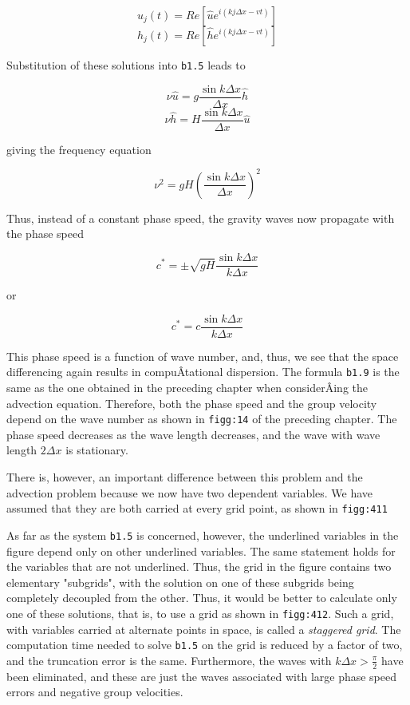 {\[u_{j}\left( t \right) = Re\left\lbrack \widehat{u}e^{i\left( kj\Delta x - vt \right)} \right\rbrack\]\[h_{j}\left( t \right) = Re\left\lbrack \widehat{h}e^{i\left( kj\Delta x - vt \right)} \right\rbrack\]}

Substitution of these solutions into \texttt{b1.5} leads to

\[\nu\widehat{u} = g\frac{\sin{k\Delta x}}{\Delta x}\widehat{h}\]\[\nu\widehat{h} = H\frac{\sin{k\Delta x}}{\Delta x}\widehat{u}\]

giving the frequency equation

{\[\nu^{2} = gH\left( \frac{\sin{k\Delta x}}{\Delta x} \right)^{2}\]}

Thus, instead of a constant phase speed, the gravity waves now propagate
with the phase speed

{\[c^{*} = \pm \sqrt{gH}\frac{\sin{k\Delta x}}{k \Delta x}\]}

or

{\[c^{*} = c \frac{\sin{k\Delta x}}{k\Delta x}\]}

This phase speed is a function of wave number, and, thus, we see that
the space differencing again results in compuÂ­tational dispersion. The
formula \texttt{b1.9} is the same as the one obtained in the preceding
chapter when considerÂ­ing the advection equation. Therefore, both the
phase speed and the group velocity depend on the wave number as shown in
\texttt{figg:14} of the preceding chapter. The phase speed decreases as
the wave length decreases, and the wave with wave length \(2\Delta x\)
is stationary.

There is, however, an important difference between this problem and the
advection problem because we now have two dependent variables. We have
assumed that they are both carried at every grid point, as shown in
\texttt{figg:411}

\begin{figure}
\centering
{}
\caption{}
\end{figure}

As far as the system \texttt{b1.5} is concerned, however, the underlined
variables in the figure depend only on other underlined variables. The
same statement holds for the variables that are not underlined. Thus,
the grid in the figure contains two elementary "subgrids", with the
solution on one of these subgrids being completely decoupled from the
other. Thus, it would be better to calculate only one of these
solutions, that is, to use a grid as shown in \texttt{figg:412}. Such a
grid, with variables carried at alternate points in space, is called a
\emph{staggered grid}. The computation time needed to solve
\texttt{b1.5} on the grid is reduced by a factor of two, and the
truncation error is the same. Furthermore, the waves with
\(k\Delta x > \frac{\pi}{2}\) have been eliminated, and these are just
the waves associated with large phase speed errors and negative group
velocities.

